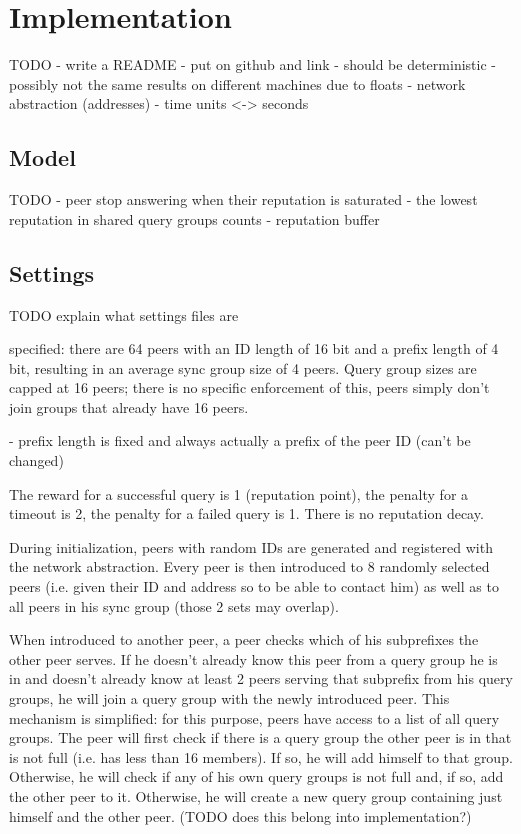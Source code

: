 \chapter{Implementation}
TODO
- write a README
- put on github and link
- should be deterministic
- possibly not the same results on different machines due to floats
- network abstraction (addresses)
- time units <-> seconds

\section{Model}
TODO
- peer stop answering when their reputation is saturated
- the lowest reputation in shared query groups counts
- reputation buffer
\section{Settings}
TODO explain what settings files are

specified: there are 64 peers with an ID length of 16 bit and a prefix length of
4 bit, resulting in an average sync group size of 4 peers. Query group sizes are
capped at 16 peers; there is no specific enforcement of this, peers simply don't
join groups that already have 16 peers.

- prefix length is fixed and always actually a prefix of the peer ID (can't be
  changed)

The reward for a successful query is 1 (reputation point), the penalty for a
timeout is 2, the penalty for a failed query is 1. There is no reputation decay.

During initialization, peers with random IDs are generated and registered with
the network abstraction. Every peer is then introduced to 8 randomly selected
peers (i.e. given their ID and address so to be able to contact him) as well as
to all peers in his sync group (those 2 sets may overlap).

When introduced to another peer, a peer checks which of his subprefixes the
other peer serves. If he doesn't already know this peer from a query group he is
in and doesn't already know at least 2 peers serving that subprefix from his
query groups, he will join a query group with the newly introduced peer. This
mechanism is simplified: for this purpose, peers have access to a list of all
query groups. The peer will first check if there is a query group the other peer
is in that is not full (i.e. has less than 16 members). If so, he will add
himself to that group. Otherwise, he will check if any of his own query groups
is not full and, if so, add the other peer to it. Otherwise, he will create a
new query group containing just himself and the other peer. (TODO does this
belong into implementation?)

